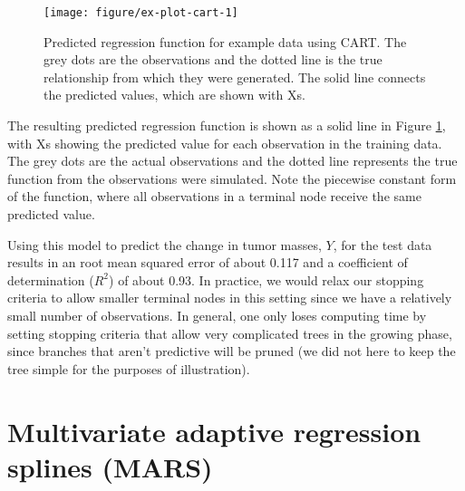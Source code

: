 \documentclass[12pt]{article}
\begin{document}
\begin{figure}[!htbp]

{\centering \texttt{[image: figure/ex-plot-cart-1]} 

}

\caption[Predicted regression function for example data using CART]{Predicted regression function for example data using CART. The grey dots are the observations and the dotted line is the true relationship from which they were generated. The solid line connects the predicted values, which are shown with Xs.}\label{fig:ex-plot-cart}
\end{figure}


The resulting predicted regression function is shown as a solid line in Figure \ref{fig:ex-plot-cart}, with Xs showing the predicted value for each observation in the training data. The grey dots are the actual observations and the dotted line represents the true function from the observations were simulated. Note the piecewise constant form of the function, where all observations in a terminal node receive the same predicted value.

Using this model to predict the change in tumor masses, $Y$, for the test data results in an root mean squared error of about 0.117 and a coefficient of determination ($R^2$) of about 0.93. In practice, we would relax our stopping criteria to allow smaller terminal nodes in this setting since we have a relatively small number of observations. In general, one only loses computing time by setting stopping criteria that allow very complicated trees in the growing phase, since branches that aren't predictive will be pruned (we did not here to keep the tree simple for the purposes of illustration).




\section{Multivariate adaptive regression splines (MARS)} %
\label{sec:mars}
\end{document}
